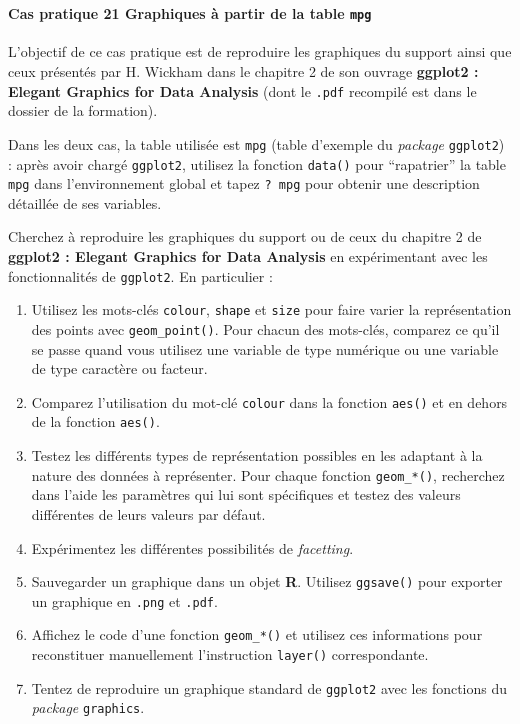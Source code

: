 \documentclass[12pt,]{article}
\providecommand{\tightlist}{%
  \setlength{\itemsep}{0pt}\setlength{\parskip}{0pt}}
\let\oldparagraph\paragraph
\renewcommand{\paragraph}[1]{\oldparagraph{#1}\mbox{}}
\begin{document}
~

\paragraph{\texorpdfstring{\textbf{Cas pratique 21} Graphiques à partir
de la table
\texttt{mpg}}{Cas pratique 21 Graphiques à partir de la table mpg}}\label{cas-pratique-21-graphiques-a-partir-de-la-table-mpg}

L'objectif de ce cas pratique est de reproduire les graphiques du
support ainsi que ceux présentés par H. Wickham dans le chapitre 2 de
son ouvrage \textbf{ggplot2 : Elegant Graphics for Data Analysis} (dont
le \texttt{.pdf} recompilé est dans le dossier de la formation).

Dans les deux cas, la table utilisée est \texttt{mpg} (table d'exemple
du \emph{package} \texttt{ggplot2}) : après avoir chargé
\texttt{ggplot2}, utilisez la fonction \texttt{data()} pour
``rapatrier'' la table \texttt{mpg} dans l'environnement global et tapez
\texttt{?\ mpg} pour obtenir une description détaillée de ses variables.

Cherchez à reproduire les graphiques du support ou de ceux du chapitre 2
de \textbf{ggplot2 : Elegant Graphics for Data Analysis} en
expérimentant avec les fonctionnalités de \texttt{ggplot2}. En
particulier :

\begin{enumerate}
\def\labelenumi{\alph{enumi}.}
\tightlist
\item
  Utilisez les mots-clés \texttt{colour}, \texttt{shape} et
  \texttt{size} pour faire varier la représentation des points avec
  \texttt{geom\_point()}. Pour chacun des mots-clés, comparez ce qu'il
  se passe quand vous utilisez une variable de type numérique ou une
  variable de type caractère ou facteur.
\item
  Comparez l'utilisation du mot-clé \texttt{colour} dans la fonction
  \texttt{aes()} et en dehors de la fonction \texttt{aes()}.
\item
  Testez les différents types de représentation possibles en les
  adaptant à la nature des données à représenter. Pour chaque fonction
  \texttt{geom\_*()}, recherchez dans l'aide les paramètres qui lui sont
  spécifiques et testez des valeurs différentes de leurs valeurs par
  défaut.
\item
  Expérimentez les différentes possibilités de \emph{facetting}.
\item
  Sauvegarder un graphique dans un objet \textbf{R}. Utilisez
  \texttt{ggsave()} pour exporter un graphique en \texttt{.png} et
  \texttt{.pdf}.
\item
  Affichez le code d'une fonction \texttt{geom\_*()} et utilisez ces
  informations pour reconstituer manuellement l'instruction
  \texttt{layer()} correspondante.
\item
  Tentez de reproduire un graphique standard de \texttt{ggplot2} avec
  les fonctions du \emph{package} \texttt{graphics}.
\end{enumerate}
\end{document}
